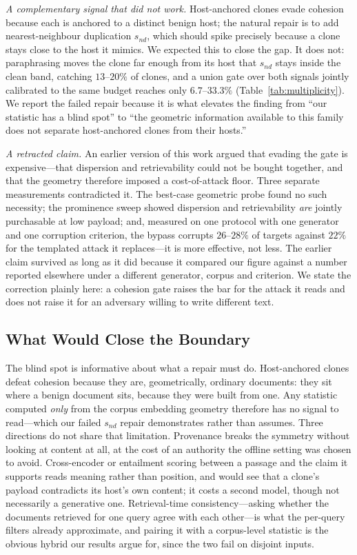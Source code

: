 \documentclass[10pt,journal,compsoc]{IEEEtran}
\begin{document}
\emph{A complementary signal that did not work.} Host-anchored clones evade cohesion because each
is anchored to a distinct benign host; the natural repair is to add nearest-neighbour duplication
$s_{nd}$, which should spike precisely because a clone stays close to the host it mimics. We
expected this to close the gap. It does not: paraphrasing moves the clone far enough from its
host that $s_{nd}$ stays inside the clean band, catching $13$--$20\%$ of clones, and a union gate
over both signals jointly calibrated to the same budget reaches only $6.7$--$33.3\%$
(Table~\ref{tab:multiplicity}). We report the failed repair because it is what elevates the
finding from ``our statistic has a blind spot'' to ``the geometric information available to this
family does not separate host-anchored clones from their hosts.''

\emph{A retracted claim.} An earlier version of this work argued that evading the gate is
expensive---that dispersion and retrievability could not be bought together, and that the
geometry therefore imposed a cost-of-attack floor. Three separate measurements contradicted it.
The best-case geometric probe found no such necessity; the prominence sweep showed dispersion and
retrievability \emph{are} jointly purchasable at low payload; and, measured on one protocol with
one generator and one corruption criterion, the bypass corrupts $26$--$28\%$ of targets against
$22\%$ for the templated attack it replaces---it is more effective, not less. The earlier claim
survived as long as it did because it compared our figure against a number reported elsewhere
under a different generator, corpus and criterion. We state the correction plainly here: a
cohesion gate raises the bar for the attack it reads and does not raise it for an adversary
willing to write different text.

\subsection{What Would Close the Boundary}
\label{app:future}
The blind spot is informative about what a repair must do. Host-anchored clones defeat cohesion
because they are, geometrically, ordinary documents: they sit where a benign document sits,
because they were built from one. Any statistic computed \emph{only} from the corpus embedding
geometry therefore has no signal to read---which our failed $s_{nd}$ repair demonstrates rather
than assumes. Three directions do not share that limitation. Provenance breaks the symmetry
without looking at content at all, at the cost of an authority the offline setting was chosen to
avoid. Cross-encoder or entailment scoring between a passage and the claim it supports reads
meaning rather than position, and would see that a clone's payload contradicts its host's own
content; it costs a second model, though not necessarily a generative one. Retrieval-time
consistency---asking whether the documents retrieved for one query agree with each other---is
what the per-query filters already approximate, and pairing it with a corpus-level statistic is
the obvious hybrid our results argue for, since the two fail on disjoint inputs.
\end{document}
